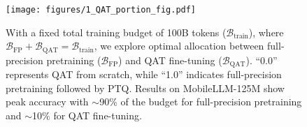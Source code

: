 \begin{figure}[t!]
    \centering
    \texttt{[image: figures/1\_QAT\_portion\_fig.pdf]}
    \caption{\small{With a fixed total training budget of 100B tokens ($\mathcal{B}_\text{train}$), where $\mathcal{B}_\text{FP} + \mathcal{B}_\text{QAT} = \mathcal{B}_\text{train}$, we explore optimal allocation between full-precision pretraining ($\mathcal{B}_\text{FP}$) and QAT fine-tuning ($\mathcal{B}_\text{QAT}$). ``0.0'' represents QAT from scratch, while ``1.0'' indicates full-precision pretraining followed by PTQ. Results on MobileLLM-125M show peak accuracy with $\sim$90\% of the budget for full-precision pretraining and $\sim$10\% for QAT fine-tuning.}
}
    \label{fig:qat_proportion}
\end{figure}
